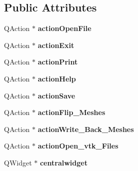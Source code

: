 \subsection*{Public Attributes}
\begin{DoxyCompactItemize}
\item 
\hypertarget{class_ui___share_camera_qt_acfdff934272365653fb01bdf22559d24}{Q\-Action $\ast$ {\bfseries action\-Open\-File}}\label{class_ui___share_camera_qt_acfdff934272365653fb01bdf22559d24}

\item 
\hypertarget{class_ui___share_camera_qt_aa918b24876b652d03470352f7387b95f}{Q\-Action $\ast$ {\bfseries action\-Exit}}\label{class_ui___share_camera_qt_aa918b24876b652d03470352f7387b95f}

\item 
\hypertarget{class_ui___share_camera_qt_a54dea5554abd387464d06d9cc3abde70}{Q\-Action $\ast$ {\bfseries action\-Print}}\label{class_ui___share_camera_qt_a54dea5554abd387464d06d9cc3abde70}

\item 
\hypertarget{class_ui___share_camera_qt_acb815d43fbada8324a34e04b903f07a2}{Q\-Action $\ast$ {\bfseries action\-Help}}\label{class_ui___share_camera_qt_acb815d43fbada8324a34e04b903f07a2}

\item 
\hypertarget{class_ui___share_camera_qt_a0e1a9e0cd8fc78ad6953551f35c942ca}{Q\-Action $\ast$ {\bfseries action\-Save}}\label{class_ui___share_camera_qt_a0e1a9e0cd8fc78ad6953551f35c942ca}

\item 
\hypertarget{class_ui___share_camera_qt_a39aceaa5f884420e2de8ec16c83a3821}{Q\-Action $\ast$ {\bfseries action\-Flip\-\_\-\-Meshes}}\label{class_ui___share_camera_qt_a39aceaa5f884420e2de8ec16c83a3821}

\item 
\hypertarget{class_ui___share_camera_qt_ae45247bf612ac283478349ee1e2b3c0e}{Q\-Action $\ast$ {\bfseries action\-Write\-\_\-\-Back\-\_\-\-Meshes}}\label{class_ui___share_camera_qt_ae45247bf612ac283478349ee1e2b3c0e}

\item 
\hypertarget{class_ui___share_camera_qt_a72cec3081624b47596ee5af6e10a7a33}{Q\-Action $\ast$ {\bfseries action\-Open\-\_\-vtk\-\_\-\-Files}}\label{class_ui___share_camera_qt_a72cec3081624b47596ee5af6e10a7a33}

\item 
\hypertarget{class_ui___share_camera_qt_a59ec436a79a7c2a2e8b111157b6ffc2d}{Q\-Widget $\ast$ {\bfseries centralwidget}}\label{class_ui___share_camera_qt_a59ec436a79a7c2a2e8b111157b6ffc2d}


\end{DoxyCompactItemize}
